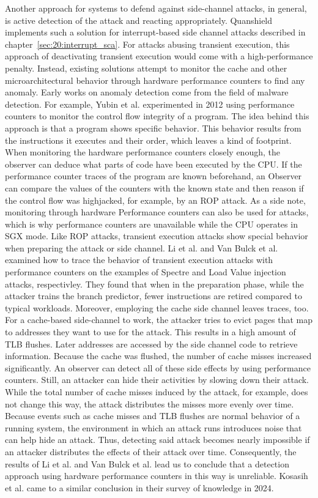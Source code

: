 Another approach for systems to defend against side-channel attacks, in general,
is active detection of the attack and reacting appropriately. Quanshield
implements such a solution for interrupt-based side channel attacks described in
chapter~\ref{sec:20:interrupt_sca}. For attacks abusing transient execution,
this approach of deactivating transient execution would come with a
high-performance penalty. Instead, existing solutions attempt to monitor the
cache and other microarchitectural behavior through hardware performance
counters to find any anomaly. Early works on anomaly detection come from the
field of malware detection. For example, Yubin et al. experimented in 2012 using
performance counters to monitor the control flow integrity of a program.
\cite{yubin_xia_cfimon_2012} The idea behind this approach is that a program
shows specific behavior. This behavior results from the instructions it executes
and their order, which leaves a kind of footprint. When monitoring the hardware
performance counters closely enough, the observer can deduce what parts of code
have been executed by the CPU. If the performance counter traces of the program
are known beforehand, an Observer can compare the values of the counters with
the known state and then reason if the control flow was highjacked, for example,
by an ROP attack. As a side note, monitoring through hardware Performance
counters can also be used for attacks, which is why performance counters are
unavailable while the CPU operates in SGX mode.
\cite{uhsadel2008exploiting,costan2016intel} Like ROP attacks, transient
execution attacks show special behavior when preparing the attack or side
channel. Li et al. and Van Bulck et al. examined how to trace the behavior of
transient execution attacks with performance counters on the examples of Spectre
and Load Value injection attacks, respectivley.
\cite{li_detecting_2021, van_bulck_lvi_2020}
They found that when in the preparation phase, while the attacker trains the
branch predictor, fewer instructions are retired compared to typical workloads.
Moreover, employing the cache side channel leaves traces, too. For a cache-based
side-channel to work, the attacker tries to evict pages that map to addresses
they want to use for the attack. This results in a high amount of TLB flushes.
Later addresses are accessed by the side channel code to retrieve information.
Because the cache was flushed, the number of cache misses increased
significantly. An observer can detect all of these side effects by using
performance counters. Still, an attacker can hide their activities by slowing
down their attack. While the total number of cache misses induced by the attack,
for example, does not change this way, the attack distributes the misses more
evenly over time. Because events such as cache misses and TLB flushes are normal
behavior of a running system, the environment in which an attack runs introduces
noise that can help hide an attack. Thus, detecting said attack becomes nearly
impossible if an attacker distributes the effects of their attack over time.
Consequently, the results of Li et al. and Van Bulck et al. lead us to conclude
that a detection approach using hardware performance counters in this way is
unreliable. Kosasih et al. came to a similar conclusion in their survey of
knowledge in 2024.\cite{kosasih2024sok}
